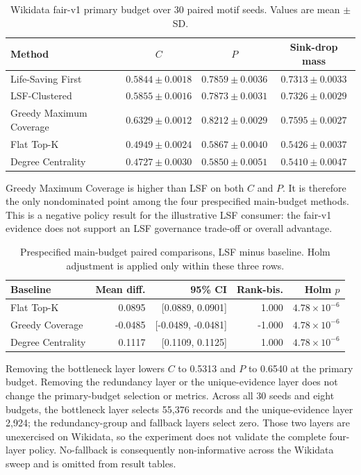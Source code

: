 \documentclass[pdflatex,sn-basic]{sn-jnl}
\begin{document}
\begin{table}[ht]
\caption{Wikidata fair-v1 primary budget over 30 paired motif seeds. Values are mean $\pm$ SD.}
\label{tab:supp-wikidata-primary}
\centering
\small
\begin{tabular}{lccc}
\toprule
Method & $C$ & $P$ & Sink-drop mass \\
\midrule
Life-Saving First & $0.5844\pm0.0018$ & $0.7859\pm0.0036$ & $0.7313\pm0.0033$ \\
LSF-Clustered & $0.5855\pm0.0016$ & $0.7873\pm0.0031$ & $0.7326\pm0.0029$ \\
Greedy Maximum Coverage & $0.6329\pm0.0012$ & $0.8212\pm0.0029$ & $0.7595\pm0.0027$ \\
Flat Top-K & $0.4949\pm0.0024$ & $0.5867\pm0.0040$ & $0.5426\pm0.0037$ \\
Degree Centrality & $0.4727\pm0.0030$ & $0.5850\pm0.0051$ & $0.5410\pm0.0047$ \\
\bottomrule
\end{tabular}
\end{table}

Greedy Maximum Coverage is higher than LSF on both $C$ and $P$. It is therefore the only nondominated point among the four prespecified main-budget methods. This is a negative policy result for the illustrative LSF consumer: the fair-v1 evidence does not support an LSF governance trade-off or overall advantage.

\begin{table}[ht]
\caption{Prespecified main-budget paired comparisons, LSF minus baseline. Holm adjustment is applied only within these three rows.}
\label{tab:supp-main-statistics}
\centering
\scriptsize
\begin{tabular}{@{}lrrrr@{}}
\toprule
Baseline & Mean diff. & 95\% CI & Rank-bis. & Holm $p$ \\
\midrule
Flat Top-K & 0.0895 & [0.0889, 0.0901] & 1.000 & $4.78\times10^{-6}$ \\
Greedy Coverage & -0.0485 & [-0.0489, -0.0481] & -1.000 & $4.78\times10^{-6}$ \\
Degree Centrality & 0.1117 & [0.1109, 0.1125] & 1.000 & $4.78\times10^{-6}$ \\
\bottomrule
\end{tabular}
\end{table}

Removing the bottleneck layer lowers $C$ to 0.5313 and $P$ to 0.6540 at the primary budget. Removing the redundancy layer or the unique-evidence layer does not change the primary-budget selection or metrics. Across all 30 seeds and eight budgets, the bottleneck layer selects 55,376 records and the unique-evidence layer 2,924; the redundancy-group and fallback layers select zero. Those two layers are unexercised on Wikidata, so the experiment does not validate the complete four-layer policy. No-fallback is consequently non-informative across the Wikidata sweep and is omitted from result tables.
\end{document}
